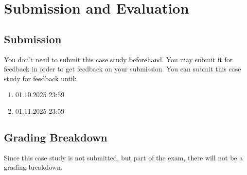 \section{Submission and Evaluation}

\subsection{Submission}
You don't need to submit this case study beforehand. You may submit it for feedback in order to get feedback on your submission. You can submit this case study for feedback until:

\begin{enumerate}
    \item 01.10.2025 23:59
    \item 01.11.2025 23:59
\end{enumerate}

\subsection{Grading Breakdown}

Since this case study is not submitted, but part of the exam, there will not be a grading breakdown.